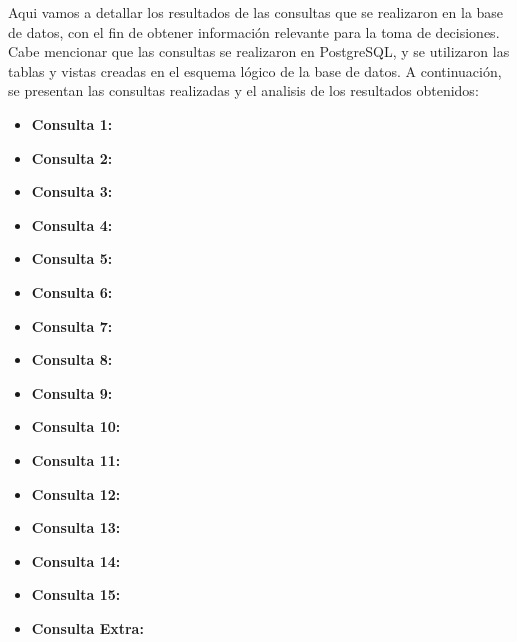 Aqui vamos a detallar los resultados de las consultas que se realizaron en la base de datos, con el fin de obtener información relevante para la toma de decisiones. Cabe mencionar que las consultas se realizaron en PostgreSQL, y se utilizaron las tablas y vistas creadas en el esquema lógico de la base de datos. A continuación, se presentan las consultas realizadas y el analisis de los resultados obtenidos:
\begin{itemize}
    \item \textbf{Consulta 1:} 
    \newpage
    \item \textbf{Consulta 2:} 
    \newpage
    \item  \textbf{Consulta 3:} 
    \newpage
    \item \textbf{Consulta 4:} 
    \newpage
    \item \textbf{Consulta 5:} 
    \newpage
    \item \textbf{Consulta 6:} 
    \newpage
    \item \textbf{Consulta 7:} 
    \newpage
    \item \textbf{Consulta 8:} 
    \newpage
    \item \textbf{Consulta 9:} 
    \newpage
    \item \textbf{Consulta 10:} 
    \newpage
    \item \textbf{Consulta 11:} 
    \newpage
    \item \textbf{Consulta 12:} 
    \newpage
    \item \textbf{Consulta 13:} 
    \newpage
    \item \textbf{Consulta 14:} 
    \newpage
    \item \textbf{Consulta 15:} 
    \newpage
    \item \textbf{Consulta Extra:} 
\end{itemize}